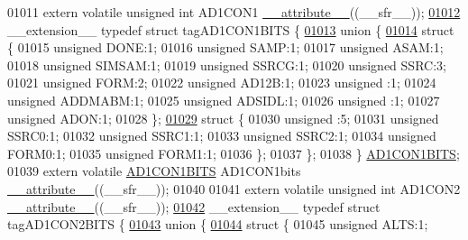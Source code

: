 \begin{DoxyCode}
01011 \textcolor{keyword}{extern} \textcolor{keyword}{volatile} \textcolor{keywordtype}{unsigned} \textcolor{keywordtype}{int}  AD1CON1 \hyperlink{a00015_a493c46f03454991ccc5aa7a6e1dfb2a7}{\_\_attribute\_\_}((\_\_sfr\_\_));
\hypertarget{a00015_source_l01012}{}\hyperlink{a00014}{01012} \_\_extension\_\_ \textcolor{keyword}{typedef} \textcolor{keyword}{struct }tagAD1CON1BITS \{
\hypertarget{a00015_source_l01013}{}\hyperlink{a00015}{01013}   \textcolor{keyword}{union }\{
\hypertarget{a00015_source_l01014}{}\hyperlink{a00015}{01014}     \textcolor{keyword}{struct }\{
01015       \textcolor{keywordtype}{unsigned} DONE:1;
01016       \textcolor{keywordtype}{unsigned} SAMP:1;
01017       \textcolor{keywordtype}{unsigned} ASAM:1;
01018       \textcolor{keywordtype}{unsigned} SIMSAM:1;
01019       \textcolor{keywordtype}{unsigned} SSRCG:1;
01020       \textcolor{keywordtype}{unsigned} SSRC:3;
01021       \textcolor{keywordtype}{unsigned} FORM:2;
01022       \textcolor{keywordtype}{unsigned} AD12B:1;
01023       \textcolor{keywordtype}{unsigned} :1;
01024       \textcolor{keywordtype}{unsigned} ADDMABM:1;
01025       \textcolor{keywordtype}{unsigned} ADSIDL:1;
01026       \textcolor{keywordtype}{unsigned} :1;
01027       \textcolor{keywordtype}{unsigned} ADON:1;
01028     \};
\hypertarget{a00015_source_l01029}{}\hyperlink{a00015}{01029}     \textcolor{keyword}{struct }\{
01030       \textcolor{keywordtype}{unsigned} :5;
01031       \textcolor{keywordtype}{unsigned} SSRC0:1;
01032       \textcolor{keywordtype}{unsigned} SSRC1:1;
01033       \textcolor{keywordtype}{unsigned} SSRC2:1;
01034       \textcolor{keywordtype}{unsigned} FORM0:1;
01035       \textcolor{keywordtype}{unsigned} FORM1:1;
01036     \};
01037   \};
01038 \} \hyperlink{a00014_d2/d1f/a00083}{AD1CON1BITS};
01039 \textcolor{keyword}{extern} \textcolor{keyword}{volatile} \hyperlink{a00014_d2/d1f/a00083}{AD1CON1BITS} AD1CON1bits \hyperlink{a00015_a493c46f03454991ccc5aa7a6e1dfb2a7}{\_\_attribute\_\_}((\_\_sfr\_\_));
01040 
01041 \textcolor{keyword}{extern} \textcolor{keyword}{volatile} \textcolor{keywordtype}{unsigned} \textcolor{keywordtype}{int}  AD1CON2 \hyperlink{a00015_a493c46f03454991ccc5aa7a6e1dfb2a7}{\_\_attribute\_\_}((\_\_sfr\_\_));
\hypertarget{a00015_source_l01042}{}\hyperlink{a00014}{01042} \_\_extension\_\_ \textcolor{keyword}{typedef} \textcolor{keyword}{struct }tagAD1CON2BITS \{
\hypertarget{a00015_source_l01043}{}\hyperlink{a00015}{01043}   \textcolor{keyword}{union }\{
\hypertarget{a00015_source_l01044}{}\hyperlink{a00015}{01044}     \textcolor{keyword}{struct }\{
01045       \textcolor{keywordtype}{unsigned} ALTS:1;

\end{DoxyCode}
